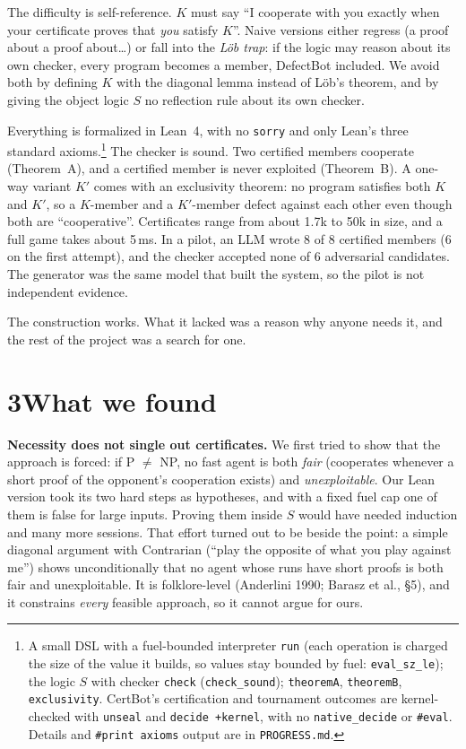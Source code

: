 \documentclass[11pt]{article}
\begin{document}
The difficulty is self-reference. $K$ must say ``I cooperate with you exactly when your certificate proves that \emph{you} satisfy $K$''. Naive versions either regress (a proof about a proof about\ldots) or fall into the \emph{Löb trap}: if the logic may reason about its own checker, every program becomes a member, DefectBot included. We avoid both by defining $K$ with the diagonal lemma instead of Löb's theorem, and by giving the object logic $S$ no reflection rule about its own checker.

Everything is formalized in Lean~4, with no \texttt{sorry} and only Lean's three standard axioms.\footnote{A small DSL with a fuel-bounded interpreter \texttt{run} (each operation is charged the size of the value it builds, so values stay bounded by fuel: \texttt{eval\_sz\_le}); the logic $S$ with checker \texttt{check} (\texttt{check\_sound}); \texttt{theoremA}, \texttt{theoremB}, \texttt{exclusivity}. CertBot's certification and tournament outcomes are kernel-checked with \texttt{unseal} and \texttt{decide +kernel}, with no \texttt{native\_decide} or \texttt{\#eval}. Details and \texttt{\#print axioms} output are in \texttt{PROGRESS.md}.} The checker is sound. Two certified members cooperate (Theorem~A), and a certified member is never exploited (Theorem~B). A one-way variant $K'$ comes with an exclusivity theorem: no program satisfies both $K$ and $K'$, so a $K$-member and a $K'$-member defect against each other even though both are ``cooperative''. Certificates range from about 1.7k to 50k in size, and a full game takes about 5\,ms. In a pilot, an LLM wrote 8 of 8 certified members (6 on the first attempt), and the checker accepted none of 6 adversarial candidates. The generator was the same model that built the system, so the pilot is not independent evidence.

The construction works. What it lacked was a reason why anyone needs it, and the rest of the project was a search for one.

\section*{3\quad What we found}

\textbf{Necessity does not single out certificates.} We first tried to show that the approach is forced: if P $\neq$ NP, no fast agent is both \emph{fair} (cooperates whenever a short proof of the opponent's cooperation exists) and \emph{unexploitable}. Our Lean version took its two hard steps as hypotheses, and with a fixed fuel cap one of them is false for large inputs. Proving them inside $S$ would have needed induction and many more sessions. That effort turned out to be beside the point: a simple diagonal argument with Contrarian (``play the opposite of what you play against me'') shows unconditionally that no agent whose runs have short proofs is both fair and unexploitable. It is folklore-level (Anderlini 1990; Barasz et al., \S5), and it constrains \emph{every} feasible approach, so it cannot argue for ours.
\end{document}
